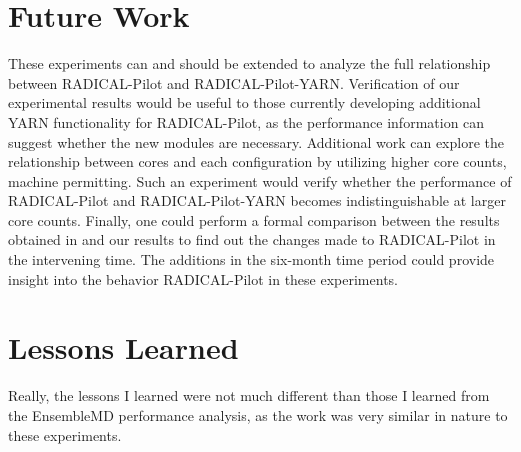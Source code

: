 \documentclass[]{article}
\begin{document}
\section{Future Work}
	These experiments can and should be extended to analyze the full relationship between RADICAL-Pilot and RADICAL-Pilot-YARN. Verification of our experimental results would be useful to those currently developing additional YARN functionality for RADICAL-Pilot, as the performance information can suggest whether the new modules are necessary. Additional work can explore the relationship between cores and each configuration by utilizing higher core counts, machine permitting. Such an experiment would verify whether the performance of RADICAL-Pilot and RADICAL-Pilot-YARN becomes indistinguishable at larger core counts. Finally, one could perform a formal comparison between the results obtained in \cite{hadoop_paper} and our results to find out the changes made to RADICAL-Pilot in the intervening time. The additions in the six-month time period could provide insight into the behavior RADICAL-Pilot in these experiments.

\section{Lessons Learned}
	Really, the lessons I learned were not much different than those I learned from the EnsembleMD performance analysis, as the work was very similar in nature to these experiments.


\end{document}
